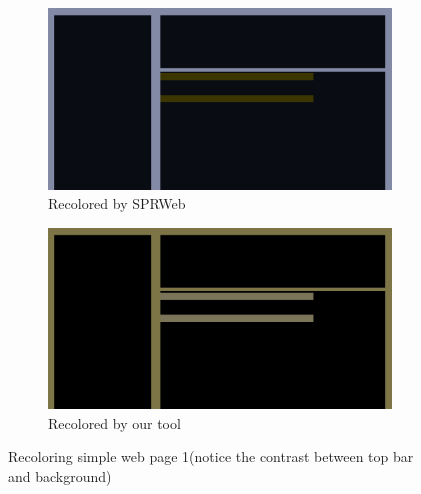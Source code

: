 \begin{figure}
\centering
\begin{subfigure}{.5\textwidth}
  \centering
  \includegraphics[width=0.9\linewidth]{SPRWebrecolored1.png}
  \caption{Recolored by SPRWeb}
  \label{fig:sub1}
\end{subfigure}%
\begin{subfigure}{.5\textwidth}
  \centering
  \includegraphics[width=0.9\linewidth]{recoloredbyus1.png}
  \caption{Recolored by our tool}
  \label{fig:sub2}
\end{subfigure}
\caption{Recoloring simple web page 1(notice the contrast between top bar and background)}
\label{fig:test}
\end{figure}

